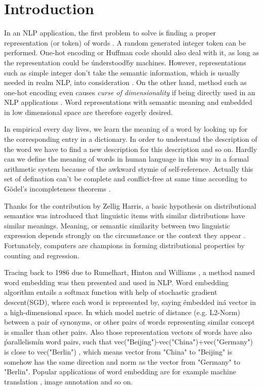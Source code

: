 \section{Introduction}
In an NLP application, the first problem to solve is finding a proper representation (or token) of words \cite{schutze2008introduction}. A random generated integer token can be performed. One-hot encoding \cite{turian2010word} or Huffman code \cite{el2006compression} should also deal with it, as long as the representation could be \'understood\' by machines. However, representations such as simple integer don't take the semantic information, which is usually needed in realm NLP, into consideration \cite{le2014distributed}. On the other hand, method such as one-hot encoding even causes \textit{curse of dimensionality} if being directly used in an NLP applications \cite{bengio2003neural}. Word representations with semantic meaning and embedded in low dimensional space are therefore eagerly desired.

In empirical every day lives, we learn the meaning of a word by looking up for the corresponding entry in a dictionary. In order to understand the description of the word we have to find a new description for this description and so on. Hardly can we define the meaning of words in human language in this way in a formal arithmetic system because of the awkward stymie of self-reference. Actually this set of defination can't be complete and conflict-free at same time according to G{\"o}del's incompleteness theorems \cite{godel1931formal}.

Thanks for the contribution by Zellig Harris, a basic hypothesis on distributional semantics was introduced that linguistic items with similar distributions have similar meanings. Meaning, or semantic similarity between two linguistic expression depends strongly on the circumstance or the context they appear \cite{harris1954distributional}. Fortunately, computers are champions in forming distributional properties by counting and regression.

Tracing back to 1986 due to Rumelhart, Hinton and Williams \cite{williams1986learning}, a method named word embedding was then presented and used in NLP. Word embedding algorithm entails a softmax function with help of stochastic gradient descent(SGD), where each word is represented by, saying \'embedded in\' a vector in a high-dimensional space. In which model metric of distance (e.g. L2-Norm) between a pair of synonyms, or other pairs of words representing similar concept is smaller than other pairs. Also those representation vectors of words have also \'parallelism\' in word pairs, such that vec("Beijing")-vec("China")+vec("Germany") is close to vec("Berlin") \cite{le2014distributed}, which means vector from "China" to "Beijing" is somehow has the same direction and norm as the vector from "Germany" to "Berlin". Popular applications of word embedding are for example machine translation \cite{cho2014learning}, image annotation \cite{weston2011wsabie} and so on. 

